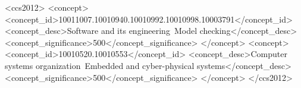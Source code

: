 

\begin{CCSXML}
	<ccs2012>
	<concept>
	<concept_id>10011007.10010940.10010992.10010998.10003791</concept_id>
	<concept_desc>Software and its engineering~Model checking</concept_desc>
	<concept_significance>500</concept_significance>
	</concept>
	<concept>
	<concept_id>10010520.10010553</concept_id>
	<concept_desc>Computer systems organization~Embedded and cyber-physical systems</concept_desc>
	<concept_significance>500</concept_significance>
	</concept>
	</ccs2012>
\end{CCSXML}


